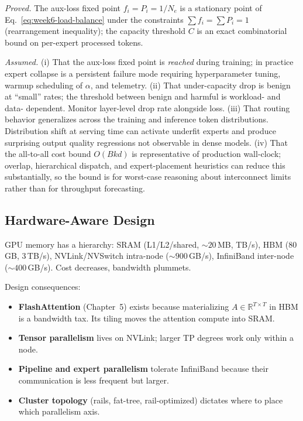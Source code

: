\begin{provedassumed}
\emph{Proved.}
The aux-loss fixed point $f_i = P_i = 1/N_e$ is a stationary point of
Eq.~\eqref{eq:week6-load-balance} under the constraints $\sum f_i
= \sum P_i = 1$ (rearrangement inequality); the capacity threshold
$C$ is an exact combinatorial bound on per-expert processed tokens.

\emph{Assumed.}
(i) That the aux-loss fixed point is \emph{reached} during training;
in practice expert collapse is a persistent failure mode requiring
hyperparameter tuning, warmup scheduling of $\alpha$, and telemetry.
(ii) That under-capacity drop is benign at ``small'' rates; the
threshold between benign and harmful is workload- and data-
dependent. Monitor layer-level drop rate alongside loss.
(iii) That routing behavior generalizes across the training and
inference token distributions. Distribution shift at serving time
can activate underfit experts and produce surprising output quality
regressions not observable in dense models.
(iv) That the all-to-all cost bound $O(B k d)$ is representative of
production wall-clock; overlap, hierarchical dispatch, and
expert-placement heuristics can reduce this substantially, so the
bound is for worst-case reasoning about interconnect limits rather
than for throughput forecasting.
\end{provedassumed}

\subsection{Hardware-Aware Design}

GPU memory has a hierarchy: SRAM (L1/L2/shared, $\sim\!20$\,MB, TB/s),
HBM (80\,GB, 3\,TB/s), NVLink/NVSwitch intra-node
($\sim\!900$\,GB/s), InfiniBand inter-node ($\sim\!400$\,GB/s). Cost
decreases, bandwidth plummets.

Design consequences:
\begin{itemize}
  \item \textbf{FlashAttention} (Chapter~5) exists because
        materializing $A \in \mathbb{R}^{T \times T}$ in HBM is a
        bandwidth tax. Its tiling moves the attention compute into
        SRAM.
  \item \textbf{Tensor parallelism} lives on NVLink; larger TP
        degrees work only within a node.
  \item \textbf{Pipeline and expert parallelism} tolerate InfiniBand
        because their communication is less frequent but larger.
  \item \textbf{Cluster topology} (rails, fat-tree, rail-optimized)
        dictates where to place which parallelism axis.
\end{itemize}

